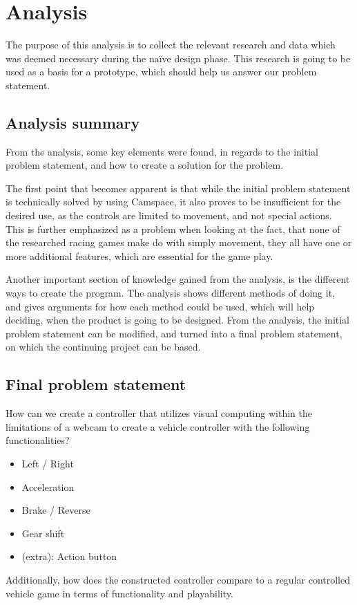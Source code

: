 \section{Analysis} \label{sec:analysis}
The purpose of this analysis is to collect the relevant research and data which was deemed necessary during the naïve design phase. This research is going to be used as a basis for a prototype, which should help us answer our problem statement. 










\subsection{Analysis summary}
From the analysis, some key elements were found, in regards to the initial problem statement, and how to create a solution for the problem.

The first point that becomes apparent is that while the initial problem statement is technically solved by using Camspace, it also proves to be insufficient for the desired use, as the controls are limited to movement, and not special actions. This is further emphasized as a problem when looking at the fact, that none of the researched racing games make do with simply movement, they all have one or more additional features, which are essential for the game play.

Another important section of knowledge gained from the analysis, is the different ways to create the program. The analysis shows different methods of doing it, and gives arguments for how each method could be used, which will help deciding, when the product is going to be designed.
From the analysis, the initial problem statement can be modified, and turned into a final problem statement, on which the continuing project can be based.


\subsection{Final problem statement}
How can we create a controller that utilizes visual computing within the limitations of a webcam to create a vehicle controller with the following functionalities?
\begin{itemize}
\item Left / Right
\item Acceleration
\item Brake / Reverse
\item Gear shift
\item (extra): Action button
\end{itemize}
Additionally, how does the constructed controller compare to a regular controlled vehicle game in terms of functionality and playability.